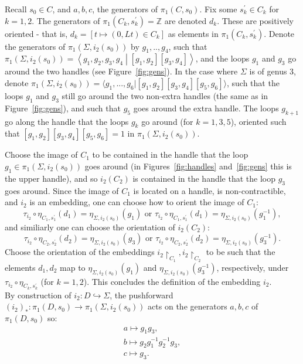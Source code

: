 \documentclass[11pt]{article}
\newenvironment{myequation}
    {
        \begin{equation*}
        \begin{gathered}
    }
    { 
        \end{gathered} 
        \end{equation*}
    }
\newcommand{\Z}{\mathbb{Z}}
\begin{document}
            Recall $s_0 \in C$, and $a,b,c$, the generators of $\pi_1(C, s_0)$. Fix some $s^\prime_k \in C_k$ for $k=1,2$. The generators of $\pi_1(C_k,s^\prime_k) = \Z$ are denoted $d_k$. These are positively oriented - that is, $d_k = [t\mapsto(0,Lt) \in C_k]$ as elements in $\pi_1(C_k,s_k^\prime)$. Denote the generators of $\pi_1(\Sigma, i_2(s_0))$ by $g_1,..,g_4$, such that $\pi_1 (\Sigma, i_2(s_0)) = \left\langle g_1,g_2,g_3,g_4\middle|[g_1,g_2] [g_3,g_4] \right\rangle$, and the loops $g_1$ and $g_3$ go around the two handles (see Figure~\ref{fig:gens}). In the case where $\Sigma$ is of genus 3, denote $\pi_1(\Sigma, i_2(s_0)) = \langle g_1, ..., g_6 | [g_1,g_2] [g_3,g_4] [g_5,g_6] \rangle$, such that the loops $g_1$ and $g_3$ still go around the two non-extra handles (the same as in Figure~\ref{fig:gens}), and such that $g_5$ goes around the extra handle. The loops $g_{k+1}$ go along the handle that the loops $g_k$ go around (for $k = 1,3,5$), oriented such that $[g_1,g_2][g_3,g_4][g_5,g_6] = 1$ in $\pi_1(\Sigma, i_2(s_0))$.
            
            Choose the image of $C_1$ to be contained in the handle that the loop $g_1 \in \pi_1(\Sigma, i_2(s_0))$ goes around (in Figures~\ref{fig:handles} and~\ref{fig:gens} this is the upper handle), and so $i_2(C_2)$ is contained in the handle that the loop $g_3$ goes around. Since the image of $C_1$ is located on a handle, is non-contractible, and $i_2$ is an embedding, one can choose how to orient the image of $C_1$:
            \[
                \tau_{i_2} \circ \eta_{C_1,s_1^\prime} (d_1) = \eta_{\Sigma, i_2(s_0)} (g_1) \text{ or } \tau_{i_2} \circ \eta_{C_1,s_1^\prime} (d_1) = \eta_{\Sigma, i_2(s_0)} (g_1^{-1}) ,
            \]
            and similiarly one can choose the orientation of $i_2(C_2)$:
            \[
                \tau_{i_2} \circ \eta_{C_2,s_2^\prime} (d_2) = \eta_{\Sigma, i_2(s_0)} (g_3) \text{ or } \tau_{i_2} \circ \eta_{C_2,s_2^\prime} (d_2) = \eta_{\Sigma, i_2(s_0)} (g_3^{-1}) .
            \]
            Choose the orientation of the embeddings $i_2\restriction_{C_1}, i_2\restriction_{C_2}$ to be such that the elements $d_1,d_2$ map to $\eta_{\Sigma, i_2(s_0)} (g_1)$ and $\eta_{\Sigma, i_2(s_0)} (g_3^{-1})$, respectively, under $\tau_{i_2} \circ \eta_{C_k, s_k^\prime}$ (for $k = 1,2$). This concludes the definition of the embedding $i_2$. \\
            
            By construction of $i_2: D \hookrightarrow \Sigma$, the pushforward $(i_2)_*: \pi_1(D, s_0) \to \pi_1(\Sigma, i_2(s_0))$ acts on the generators $a,b,c$ of $\pi_1(D,s_0)$ so:
            \begin{myequation}
                a \mapsto g_1 g_3 , \\
                b \mapsto g_2 g_1^{-1} g_2^{-1} g_3 , \\
                c \mapsto g_3 .
            \end{myequation}
            
\end{document}
